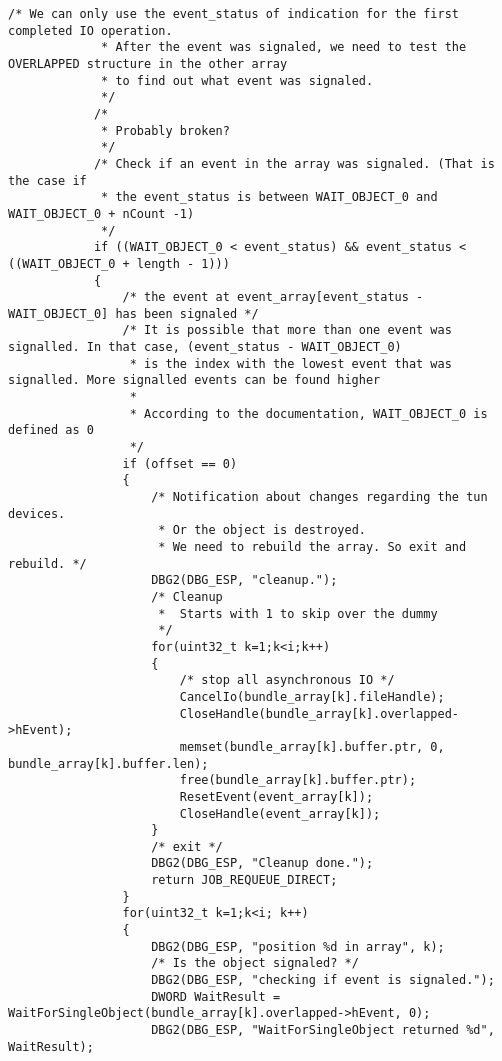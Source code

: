 \begin{lstlisting}[caption=Code für handle\_plain auf Windows,label=lst:handle-plain-windows]
            /* We can only use the event_status of indication for the first completed IO operation.
             * After the event was signaled, we need to test the OVERLAPPED structure in the other array
             * to find out what event was signaled.
             */
            /*
             * Probably broken?
             */
            /* Check if an event in the array was signaled. (That is the case if
             * the event_status is between WAIT_OBJECT_0 and WAIT_OBJECT_0 + nCount -1)
             */
            if ((WAIT_OBJECT_0 < event_status) && event_status < ((WAIT_OBJECT_0 + length - 1)))
            {
                /* the event at event_array[event_status - WAIT_OBJECT_0] has been signaled */
                /* It is possible that more than one event was signalled. In that case, (event_status - WAIT_OBJECT_0)
                 * is the index with the lowest event that was signalled. More signalled events can be found higher
                 *
                 * According to the documentation, WAIT_OBJECT_0 is defined as 0
                 */
                if (offset == 0)
                {
                    /* Notification about changes regarding the tun devices.
                     * Or the object is destroyed.
                     * We need to rebuild the array. So exit and rebuild. */
                    DBG2(DBG_ESP, "cleanup.");
                    /* Cleanup
                     *  Starts with 1 to skip over the dummy
                     */
                    for(uint32_t k=1;k<i;k++)
                    {
                        /* stop all asynchronous IO */
                        CancelIo(bundle_array[k].fileHandle);
                        CloseHandle(bundle_array[k].overlapped->hEvent);
                        memset(bundle_array[k].buffer.ptr, 0, bundle_array[k].buffer.len);
                        free(bundle_array[k].buffer.ptr);
                        ResetEvent(event_array[k]);
                        CloseHandle(event_array[k]);
                    }
                    /* exit */
                    DBG2(DBG_ESP, "Cleanup done.");
                    return JOB_REQUEUE_DIRECT;
                }
                for(uint32_t k=1;k<i; k++)
                {
                    DBG2(DBG_ESP, "position %d in array", k);
                    /* Is the object signaled? */
                    DBG2(DBG_ESP, "checking if event is signaled.");
                    DWORD WaitResult = WaitForSingleObject(bundle_array[k].overlapped->hEvent, 0);
                    DBG2(DBG_ESP, "WaitForSingleObject returned %d", WaitResult);

\end{lstlisting}
